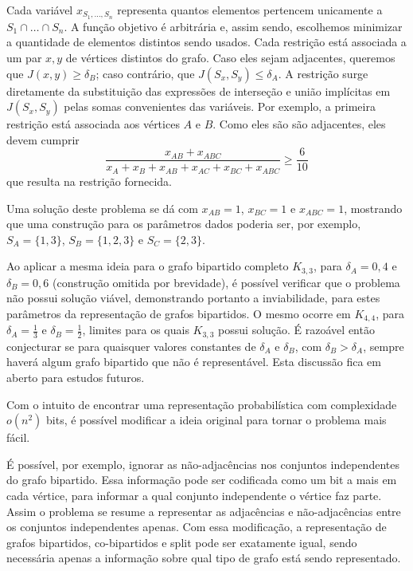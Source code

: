 Cada variável $x_{S_1,\ldots,S_n}$ representa quantos elementos pertencem unicamente a $S_1 \cap \ldots \cap S_n$. A função objetivo é arbitrária e, assim sendo, escolhemos minimizar a quantidade de elementos distintos sendo usados. Cada restrição está associada a um par $x,y$ de vértices distintos do grafo. Caso eles sejam adjacentes, queremos que $J(x,y) \geq \delta_B$; caso contrário, que $J(S_x,S_y) \leq \delta_A$. A restrição surge diretamente da substituição das expressões de interseção e união implícitas em $J(S_x,S_y)$ pelas somas convenientes das variáveis. Por exemplo, a primeira restrição está associada aos vértices $A$ e $B$. Como eles são são adjacentes, eles devem cumprir
\[
    \frac{x_{AB} + x_{ABC}}{x_{A} + x_{B} + x_{AB} + x_{AC} + x_{BC} + x_{ABC}} \geq \frac{6}{10}
\] que resulta na restrição fornecida.

Uma solução deste problema se dá com $x_{AB} = 1$, $x_{BC} = 1$ e $x_{ABC} =1$, mostrando que uma construção para os parâmetros dados poderia ser, por exemplo, $S_A = \{1, 3\}$, $S_B = \{1, 2, 3\}$ e $S_C = \{2, 3\}$.

Ao aplicar a mesma ideia para o grafo bipartido completo $K_{3,3}$, para $\delta_A = 0,4$ e $\delta_B = 0,6$ (construção omitida por brevidade), é possível verificar que o problema não possui solução viável, demonstrando portanto a inviabilidade, para estes parâmetros da representação de grafos bipartidos. O mesmo ocorre em $K_{4,4}$, para $\delta_A = \frac{1}{3}$ e $\delta_B = \frac{1}{2}$, limites para os quais $K_{3,3}$ possui solução. É razoável então conjecturar se para quaisquer valores constantes de $\delta_A$ e $\delta_B$, com $\delta_B > \delta_A$, sempre haverá algum grafo bipartido que não é representável. Esta discussão fica em aberto para estudos futuros.

Com o intuito de encontrar uma representação probabilística com complexidade $o(n^2)$ bits, é possível modificar a ideia original para tornar o problema mais fácil.

É possível, por exemplo, ignorar as não-adjacências nos conjuntos independentes do grafo bipartido. Essa informação pode ser codificada como um bit a mais em cada vértice, para informar a qual conjunto independente o vértice faz parte. Assim o problema se resume a representar as adjacências e não-adjacências entre os conjuntos independentes apenas. Com essa modificação, a representação de grafos bipartidos, co-bipartidos e split pode ser exatamente igual, sendo necessária apenas a informação sobre qual tipo de grafo está sendo representado.

